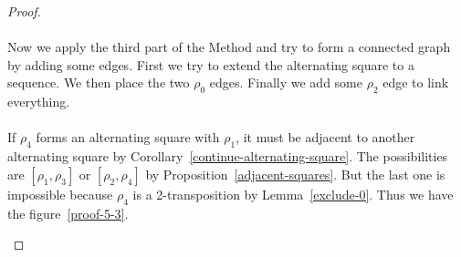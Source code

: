 \begin{proof}
\begin{figure}[H]
\begin{center}
\begin{tikzpicture}[scale=.8]
    \end{tikzpicture}
    \caption{}
    \label{proof-5-2}
  \end{center}
\end{figure}

\paragraph{}
Now we apply the third part of the Method and try to form a connected graph by adding some edges. First we try to extend the alternating square to a sequence. We then place the two $\rho_0$ edges. Finally we add some $\rho_2$ edge to link everything.

\paragraph{}
If $\rho_4$ forms an alternating square with $\rho_1$, it must be adjacent to another alternating square by Corollary~\ref{continue-alternating-square}. The possibilities are $[\rho_1, \rho_3]$ or $[\rho_2, \rho_4]$ by Proposition~\ref{adjacent-squares}. But the last one is impossible because $\rho_4$ is a 2-transposition by Lemma~\ref{exclude-0}. Thus we have the figure~\ref{proof-5-3}.

\begin{figure}[H]
  \begin{center}
\end{center}
\end{figure}
\end{proof}
